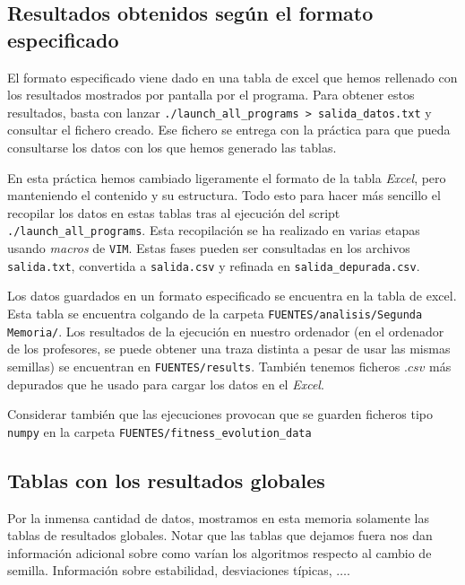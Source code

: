 \documentclass[11pt]{article}
\begin{document}
\pagebreak

\subsection{Resultados obtenidos según el formato especificado}

El formato especificado viene dado en una tabla de excel que hemos rellenado con los resultados mostrados por pantalla por el programa. Para obtener estos resultados, basta con lanzar \lstinline{./launch_all_programs > salida_datos.txt} y consultar el fichero creado. Ese fichero se entrega con la práctica para que pueda consultarse los datos con los que hemos generado las tablas.

En esta práctica hemos cambiado ligeramente el formato de la tabla \emph{Excel}, pero manteniendo el contenido y su estructura. Todo esto para hacer más sencillo el recopilar los datos en estas tablas tras al ejecución del script \lstinline{./launch_all_programs}. Esta recopilación se ha realizado en varias etapas usando \emph{macros} de \lstinline{VIM}. Estas fases pueden ser consultadas en los archivos \lstinline{salida.txt}, convertida a \lstinline{salida.csv} y refinada en \lstinline{salida_depurada.csv}.

Los datos guardados en un formato especificado se encuentra en la tabla de excel. Esta tabla se encuentra colgando de la carpeta \lstinline{FUENTES/analisis/Segunda Memoria/}. Los resultados de la ejecución en nuestro ordenador (en el ordenador de los profesores, se puede obtener una traza distinta a pesar de usar las mismas semillas) se encuentran en \lstinline{FUENTES/results}. También tenemos ficheros $.csv$ más depurados que he usado para cargar los datos en el \emph{Excel}.

Considerar también que las ejecuciones provocan que se guarden ficheros tipo \lstinline{numpy} en la carpeta \lstinline{FUENTES/fitness_evolution_data}

\subsection{Tablas con los resultados globales}

Por la inmensa cantidad de datos, mostramos en esta memoria solamente las tablas de resultados globales. Notar que las tablas que dejamos fuera nos dan información adicional sobre como varían los algoritmos respecto al cambio de semilla. Información sobre estabilidad, desviaciones típicas, $\ldots$.
\end{document}
